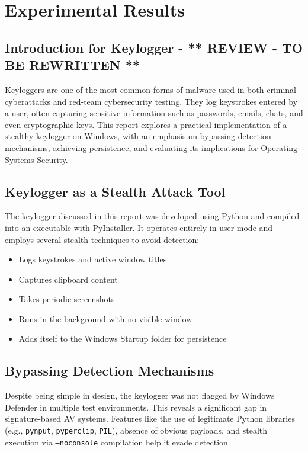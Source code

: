 \setcounter{secnumdepth}{-1}

\chapter{Experimental Results}

\section{Introduction for Keylogger - ** REVIEW - TO BE REWRITTEN **}
Keyloggers are one of the most common forms of malware used in both criminal cyberattacks and red-team cybersecurity testing. They log keystrokes entered by a user, often capturing sensitive information such as passwords, emails, chats, and even cryptographic keys. This report explores a practical implementation of a stealthy keylogger on Windows, with an emphasis on bypassing detection mechanisms, achieving persistence, and evaluating its implications for Operating Systems Security.

\section{Keylogger as a Stealth Attack Tool}
The keylogger discussed in this report was developed using Python and compiled into an executable with PyInstaller. It operates entirely in user-mode and employs several stealth techniques to avoid detection:
\begin{itemize}
    \item Logs keystrokes and active window titles
    \item Captures clipboard content
    \item Takes periodic screenshots
    \item Runs in the background with no visible window
    \item Adds itself to the Windows Startup folder for persistence
\end{itemize}

\section{Bypassing Detection Mechanisms}
Despite being simple in design, the keylogger was not flagged by Windows Defender in multiple test environments. This reveals a significant gap in signature-based AV systems. Features like the use of legitimate Python libraries (e.g., \texttt{pynput}, \texttt{pyperclip}, \texttt{PIL}), absence of obvious payloads, and stealth execution via \texttt{--noconsole} compilation help it evade detection.

